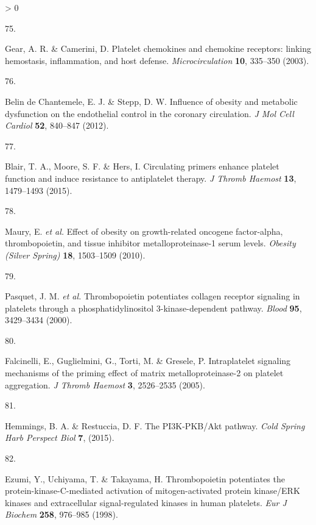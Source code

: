 \documentclass[11pt,twoside]{bristolthesis}
\newlength{\cslhangindent}
\newlength{\csllabelwidth}
\newenvironment{CSLReferences}[2] %
 {%
  \setlength{\parindent}{0pt}
  \ifodd #1 \everypar{\setlength{\hangindent}{\cslhangindent}}\ignorespaces\fi
  \ifnum #2 > 0
  \setlength{\parskip}{#2\baselineskip}
  \fi
 }%
 {}
\newcommand{\CSLLeftMargin}[1]{\parbox[t]{\csllabelwidth}{#1}}
\newcommand{\CSLRightInline}[1]{\parbox[t]{\linewidth - \csllabelwidth}{#1}\break}
\begin{document}
\begin{CSLReferences}{0}{0}
\leavevmode\hypertarget{ref-Gear2003}{}%
\CSLLeftMargin{75. }
\CSLRightInline{Gear, A. R. \& Camerini, D. {Platelet chemokines and chemokine receptors: linking hemostasis, inflammation, and host defense}. \emph{Microcirculation} \textbf{10}, 335--350 (2003).}

\leavevmode\hypertarget{ref-BelindeChantemele2012a}{}%
\CSLLeftMargin{76. }
\CSLRightInline{Belin de Chantemele, E. J. \& Stepp, D. W. {Influence of obesity and metabolic dysfunction on the endothelial control in the coronary circulation}. \emph{J Mol Cell Cardiol} \textbf{52}, 840--847 (2012).}

\leavevmode\hypertarget{ref-Blair2015}{}%
\CSLLeftMargin{77. }
\CSLRightInline{Blair, T. A., Moore, S. F. \& Hers, I. {Circulating primers enhance platelet function and induce resistance to antiplatelet therapy}. \emph{J Thromb Haemost} \textbf{13}, 1479--1493 (2015).}

\leavevmode\hypertarget{ref-Maury2010}{}%
\CSLLeftMargin{78. }
\CSLRightInline{Maury, E. \emph{et al.} {Effect of obesity on growth-related oncogene factor-alpha, thrombopoietin, and tissue inhibitor metalloproteinase-1 serum levels}. \emph{Obesity (Silver Spring)} \textbf{18}, 1503--1509 (2010).}

\leavevmode\hypertarget{ref-Pasquet2000}{}%
\CSLLeftMargin{79. }
\CSLRightInline{Pasquet, J. M. \emph{et al.} {Thrombopoietin potentiates collagen receptor signaling in platelets through a phosphatidylinositol 3-kinase-dependent pathway}. \emph{Blood} \textbf{95}, 3429--3434 (2000).}

\leavevmode\hypertarget{ref-Falcinelli2005}{}%
\CSLLeftMargin{80. }
\CSLRightInline{Falcinelli, E., Guglielmini, G., Torti, M. \& Gresele, P. {Intraplatelet signaling mechanisms of the priming effect of matrix metalloproteinase-2 on platelet aggregation}. \emph{J Thromb Haemost} \textbf{3}, 2526--2535 (2005).}

\leavevmode\hypertarget{ref-Hemmings2015}{}%
\CSLLeftMargin{81. }
\CSLRightInline{Hemmings, B. A. \& Restuccia, D. F. {The PI3K-PKB/Akt pathway}. \emph{Cold Spring Harb Perspect Biol} \textbf{7}, (2015).}

\leavevmode\hypertarget{ref-Ezumi1998}{}%
\CSLLeftMargin{82. }
\CSLRightInline{Ezumi, Y., Uchiyama, T. \& Takayama, H. {Thrombopoietin potentiates the protein-kinase-C-mediated activation of mitogen-activated protein kinase/ERK kinases and extracellular signal-regulated kinases in human platelets}. \emph{Eur J Biochem} \textbf{258}, 976--985 (1998).}


\end{CSLReferences}
\end{document}
